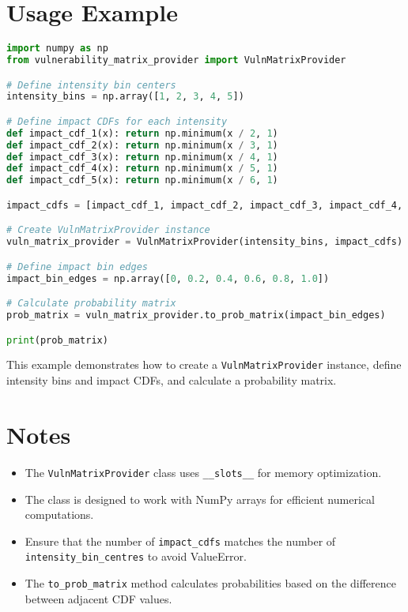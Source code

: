 \documentclass{article}
\begin{document}
\section{Usage Example}

\begin{lstlisting}[language=Python]
import numpy as np
from vulnerability_matrix_provider import VulnMatrixProvider

# Define intensity bin centers
intensity_bins = np.array([1, 2, 3, 4, 5])

# Define impact CDFs for each intensity
def impact_cdf_1(x): return np.minimum(x / 2, 1)
def impact_cdf_2(x): return np.minimum(x / 3, 1)
def impact_cdf_3(x): return np.minimum(x / 4, 1)
def impact_cdf_4(x): return np.minimum(x / 5, 1)
def impact_cdf_5(x): return np.minimum(x / 6, 1)

impact_cdfs = [impact_cdf_1, impact_cdf_2, impact_cdf_3, impact_cdf_4, impact_cdf_5]

# Create VulnMatrixProvider instance
vuln_matrix_provider = VulnMatrixProvider(intensity_bins, impact_cdfs)

# Define impact bin edges
impact_bin_edges = np.array([0, 0.2, 0.4, 0.6, 0.8, 1.0])

# Calculate probability matrix
prob_matrix = vuln_matrix_provider.to_prob_matrix(impact_bin_edges)

print(prob_matrix)
\end{lstlisting}

This example demonstrates how to create a \texttt{VulnMatrixProvider} instance, define intensity bins and impact CDFs, and calculate a probability matrix.

\section{Notes}

\begin{itemize}
    \item The \texttt{VulnMatrixProvider} class uses \texttt{\_\_slots\_\_} for memory optimization.
    \item The class is designed to work with NumPy arrays for efficient numerical computations.
    \item Ensure that the number of \texttt{impact\_cdfs} matches the number of \texttt{intensity\_bin\_centres} to avoid ValueError.
    \item The \texttt{to\_prob\_matrix} method calculates probabilities based on the difference between adjacent CDF values.
\end{itemize}
\end{document}
